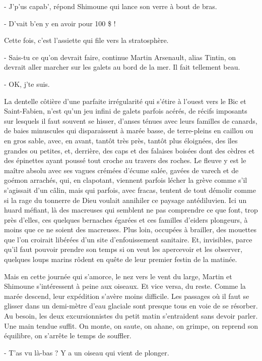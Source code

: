 - J’p’us capab’, répond Shimoune qui lance son verre à bout de bras.

- D’vait b’en y en avoir pour 100 \$ !

Cette fois, c’est l’assiette qui file vers la stratosphère.

- Sais-tu ce qu’on devrait faire, continue Martin Arsenault, alias Tintin, on devrait aller marcher sur les galets au bord de la mer. Il fait tellement beau.

- OK, j’te suis.

La dentelle côtière d’une parfaite irrégularité qui s’étire à l’ouest vers le Bic et Saint-Fabien, n’est qu’un jeu infini de galets parfois acérés, de récifs imposants sur lesquels il faut souvent se hisser, d’anses ténues avec leurs familles de canards, de baies minuscules qui disparaissent à marée basse, de terre-pleins en caillou ou en gros sable, avec, en avant, tantôt très près, tantôt plus éloignées, des îles grandes ou petites, et, derrière, des caps et des falaises boisées dont des cèdres et des épinettes ayant poussé tout croche au travers des roches. Le fleuve y est le maître absolu avec ses vagues crémées d’écume salée, gavées de varech et de goémon arrachés, qui, en clapotant, viennent parfois lécher la grève comme s’il s’agissait d’un câlin, mais qui parfois, avec fracas, tentent de tout démolir comme si la rage du tonnerre de Dieu voulait annihiler ce paysage antédiluvien. Ici un huard méfiant, là des macreuses qui semblent ne pas comprendre ce que font, trop près d’elles, ces quelques bernaches égarées et ces familles d’eiders plongeurs, à moins que ce ne soient des macreuses. Plus loin, occupées à brailler, des mouettes que l’on croirait libérées d’un site d’enfouissement sanitaire. Et, invisibles, parce qu’il faut pouvoir prendre son temps si on veut les apercevoir et les observer, quelques loups marins rôdent en quête de leur premier festin de la matinée.

Mais en cette journée qui s’amorce, le nez vers le vent du large, Martin et Shimoune s’intéressent à peine aux oiseaux. Et vice versa, du reste. Comme la marée descend, leur expédition s’avère moins difficile. Les passages où il faut se glisser dans un demi-mètre d’eau glaciale sont presque tous en voie de se résorber. Au besoin, les deux excursionnistes du petit matin s’entraident sans devoir parler. Une main tendue suffit. On monte, on saute, on ahane, on grimpe, on reprend son équilibre, on s’arrête le temps de souffler.

- T’as vu là-bas ? Y a un oiseau qui vient de plonger.

